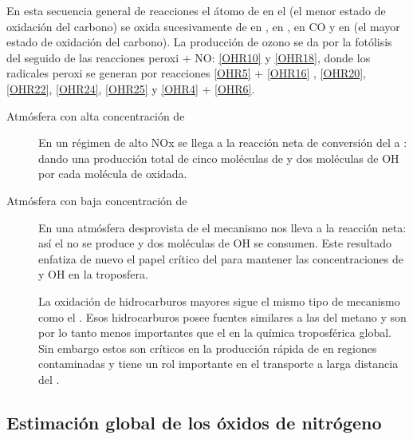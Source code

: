 En esta secuencia general de reacciones el átomo de  en el  (el menor estado de oxidación del carbono) se oxida sucesivamente de  en ,  en ,  en CO y  en   (el mayor estado de oxidación del carbono). La producción de ozono se da por la fotólisis del  seguido de las reacciones peroxi + NO: \ref{OHR10} y \ref{OHR18}, donde los radicales peroxi se generan por reacciones \ref{OHR5} + \ref{OHR16} , \ref{OHR20}, \ref{OHR22}, \ref{OHR24}, \ref{OHR25} y \ref{OHR4} + \ref{OHR6}.
\begin{description}
\item[Atmósfera con alta concentración de ]
En un régimen de alto NOx se llega a la reacción neta de conversión del  a :
dando una producción total de cinco moléculas de  y dos moléculas de OH por cada molécula de  oxidada.
\item[Atmósfera con baja concentración de ]
En una atmósfera desprovista de  el mecanismo nos lleva a la reacción neta:
así el  no se produce y dos moléculas de OH se consumen. Este resultado enfatiza de nuevo el papel crítico del  para mantener las concentraciones de   y OH en la troposfera.

La oxidación de hidrocarburos mayores sigue el mismo tipo de mecanismo como el . Esos hidrocarburos posee fuentes similares a las del metano y son por lo tanto menos importantes que el  en la química troposférica global. Sin  embargo estos son críticos en la producción rápida de   en regiones contaminadas y tiene un rol importante en el transporte a larga distancia del .
\end{description}

\subsection{Estimaci\'on global de los óxidos de nitrógeno }

